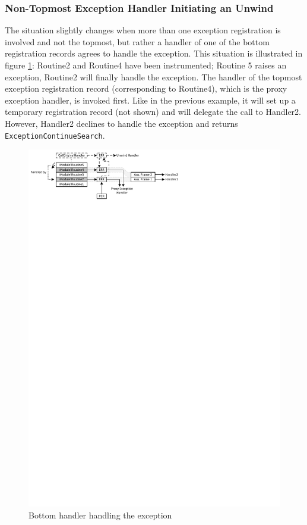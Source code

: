 \subsubsection{Non-Topmost Exception Handler Initiating an Unwind}
The situation slightly changes when more than one exception registration is 
involved and not the topmost, but rather a handler of one of the bottom registration
records agrees to handle the exception. This situation is illustrated in
figure \ref{ExceptionSimpleWithInstrBottom}: Routine2 and Routine4 have been
instrumented; Routine 5 raises an exception, Routine2 will finally handle the exception. The handler of the
topmost exception registration record (corresponding to Routine4), which is the proxy exception handler, is 
invoked first. Like in the previous example, it will set up a temporary registration 
record (not shown) and will delegate the call to Handler2. However, Handler2 declines to handle 
the exception and returns \verb|ExceptionContinueSearch|.

\begin{figure}[htbp] 
\begin{centering} 
\includegraphics[scale=1.2, clip=true, viewport=0cm 25.5cm 17cm 30cm]{images/diagrams/ExceptionSimpleWithInstrBottom.pdf} 
\caption{Bottom handler handling the exception} 
\label{ExceptionSimpleWithInstrBottom} 
\end{centering} 
\end{figure}

